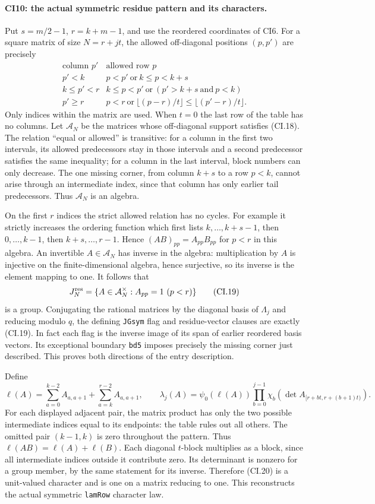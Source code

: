 \paragraph{CI10: the actual symmetric residue pattern and its characters.}
Put $s=m/2-1$, $r=k+m-1$, and use the reordered coordinates of
CI6. For a square matrix of size $N=r+jt$, the allowed off-diagonal
positions $(p,p')$ are precisely
\[
\begin{array}{c|l}
 \text{column }p'&\text{allowed row }p\\ \hline
 p'<k&p<p'\ \text{or}\ k\le p<k+s\\
 k\le p'<r&k\le p<p'\ \text{or}\ (p'>k+s\ \text{and}\ p<k)\\
 p'\ge r&p<r\ \text{or}\
       \lfloor(p-r)/t\rfloor\le\lfloor(p'-r)/t\rfloor.
\end{array}
\tag{CI.18}
\]
Only indices within the matrix are used. When $t=0$ the last row
of the table has no columns. Let $\mathcal A_N$ be the matrices
whose off-diagonal support satisfies (CI.18). The relation
``equal or allowed'' is transitive: for a column in the first
two intervals, its allowed predecessors stay in those intervals
and a second predecessor satisfies the same inequality; for a
column in the last interval, block numbers can only decrease.
The one missing corner, from column $k+s$ to a row $p<k$, cannot
arise through an intermediate index, since that column has only
earlier tail predecessors. Thus $\mathcal A_N$ is an algebra.

On the first $r$ indices the strict allowed relation has no
cycles. For example it strictly increases the ordering function
which first lists $k,\ldots,k+s-1$, then $0,\ldots,k-1$, then
$k+s,\ldots,r-1$. Hence
$(AB)_{pp}=A_{pp}B_{pp}$ for $p<r$ in this algebra. An invertible
$A\in\mathcal A_N$ has inverse in the algebra: multiplication
by $A$ is injective on the finite-dimensional algebra, hence
surjective, so its inverse is the element mapping to one.
It follows that
\[
 J_N^{\rm res}=\{A\in\mathcal A_N^\times:A_{pp}=1\ (p<r)\}
 \tag{CI.19}
\]
is a group. Conjugating the rational matrices by the diagonal
basis of $\Lambda_j$ and reducing modulo $q$, the defining
\texttt{JGsym} flag and residue-vector clauses are exactly
(CI.19). In fact each flag is the inverse image of its span of
earlier reordered basis vectors. Its exceptional boundary
\texttt{bd5} imposes precisely the missing corner just described.
This proves both directions of the entry description.

Define
\[
 \ell(A)=\sum_{a=0}^{k-2}A_{a,a+1}
          +\sum_{a=k}^{r-2}A_{a,a+1},\qquad
 \lambda_j(A)=\psi_0(\ell(A))
       \prod_{b=0}^{j-1}\chi_b(\det A_{[r+bt,r+(b+1)t)}).
 \tag{CI.20}
\]
For each displayed adjacent pair, the matrix product has only
the two possible intermediate indices equal to its endpoints:
the table rules out all others. The omitted pair $(k-1,k)$ is
zero throughout the pattern. Thus $\ell(AB)=\ell(A)+\ell(B)$.
Each diagonal $t$-block multiplies as a block, since all
intermediate indices outside it contribute zero. Its determinant
is nonzero for a group member, by the same statement for its
inverse. Therefore (CI.20) is a unit-valued character and is one
on a matrix reducing to one. This reconstructs the actual
symmetric \texttt{lamRow} character law.

